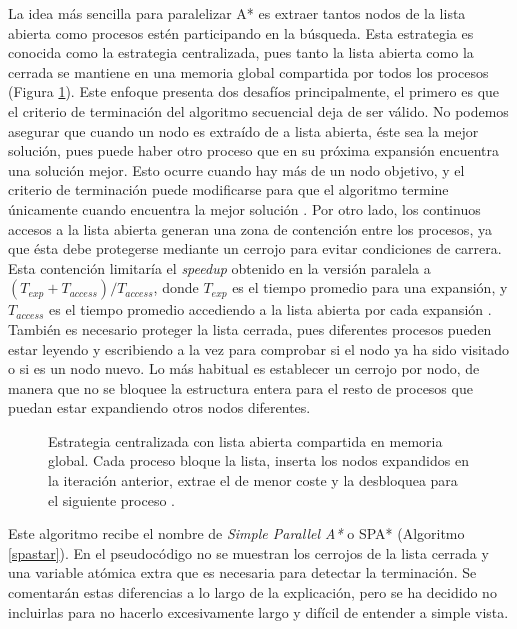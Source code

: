 \documentclass[a4paper,12pt]{article}
\begin{document}
La idea más sencilla para paralelizar A* es extraer tantos nodos de la lista abierta como procesos estén participando en la búsqueda. Esta estrategia es conocida como la estrategia centralizada, pues tanto la lista abierta como la cerrada se mantiene en una memoria global compartida por todos los procesos (Figura \ref{fig:centralizado}). Este enfoque presenta dos desafíos principalmente, el primero es que el criterio de terminación del algoritmo secuencial deja de ser válido. No podemos asegurar que cuando un nodo es extraído de a lista abierta, éste sea la mejor solución, pues puede haber otro proceso que en su próxima expansión encuentra una solución mejor. Esto ocurre cuando hay más de un nodo objetivo, y el criterio de terminación puede modificarse para que el algoritmo termine únicamente cuando encuentra la mejor solución \cite{leifker1984hybrid}. Por otro lado, los continuos accesos a la lista abierta generan una zona de contención entre los procesos, ya que ésta debe protegerse mediante un cerrojo para evitar condiciones de carrera. Esta contención limitaría el \textit{speedup} obtenido en la versión paralela a $(T_{exp} + T_{access})/T_{access}$, donde $T_{exp}$ es el tiempo promedio para una expansión, y $T_{access}$ es el tiempo promedio accediendo a la lista abierta por cada expansión \cite{huang1987tight}. También es necesario proteger la lista cerrada, pues diferentes procesos pueden estar leyendo y escribiendo a la vez para comprobar si el nodo ya ha sido visitado o si es un nodo nuevo. Lo más habitual es establecer un cerrojo por nodo, de manera que no se bloquee la estructura entera para el resto de procesos que puedan estar expandiendo otros nodos diferentes.

\begin{figure}[H]
    \centering
    
    \caption{Estrategia centralizada con lista abierta compartida en memoria global. Cada proceso bloque la lista, inserta los nodos expandidos en la iteración anterior, extrae el de menor coste y la desbloquea para el siguiente proceso \cite{grama1995parallel}.}
    \label{fig:centralizado}
\end{figure}

Este algoritmo recibe el nombre de \textit{Simple Parallel A*} o SPA* (Algoritmo \ref{spastar}). En el pseudocódigo no se muestran los cerrojos de la lista cerrada y una variable atómica extra que es necesaria para detectar la terminación. Se comentarán estas diferencias a lo largo de la explicación, pero se ha decidido no incluirlas para no hacerlo excesivamente largo y difícil de entender a simple vista.
\end{document}
